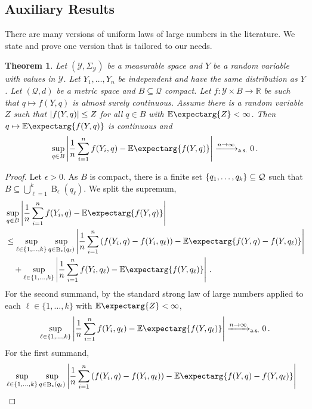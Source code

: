 \documentclass{scrartcl}
\renewcommand{\subset}{\subseteq}
\DeclareMathOperator{\ball}{\mathrm{B}}
\newcommand{\Ex}{\E\expectarg}
\newcommand*{\mc}[1]{\mathcal{#1}}
\newcommand*{\ms}[1]{\mathsf{#1}}
\newcommand{\R}{\mathbb{R}}
\newcommand{\equationFullstop}{\, .}
\newcommand{\eqfs}{\equationFullstop}
\theoremstyle{plain}\newtheorem{theorem}{Theorem}[section]
\theoremstyle{definition}
\theoremstyle{remark}
\begin{document}
\begin{appendix}
 \section{Auxiliary Results}\label{sec:aux}
There are many versions of uniform laws of large numbers in the literature. We state and prove one version that is tailored to our needs.
\begin{theorem}\label{thm:ULLN}
Let $(\mc Y, \Sigma_{\mc Y})$ be a measurable space and $Y$ be a random variable with values in $\mc Y$. Let $Y_1, \dots, Y_n$ be independent and have the same distribution as $Y$.
Let $(\mc Q, d)$ be a metric space and $B\subset \mc Q$ compact. 
Let $f \colon \mc Y \times B \to \R$ be such that $q \mapsto f(Y, q)$  is almost surely continuous. Assume there is a random variable $Z$ such that $\left| f(Y, q) \right| \leq Z$ for all $q \in B$ with $\Ex{Z} < \infty$. Then $q \mapsto \Ex{f(Y, q)}$ is continuous and 
\begin{equation*}
	\sup_{q\in B} \abs{\frac 1n \sum_{i=1}^n f(Y_i, q) - \Ex{f(Y, q)}} \xrightarrow{n\to\infty}_{\ms{a.s.}} 0 
	\eqfs
\end{equation*}
\end{theorem}
\begin{proof}
Let $\epsilon > 0$. As $B$ is compact, there is a finite set $\cb{q_1, \dots, q_k} \subset \mc Q$ such that $B \subset \bigcup_{\ell=1}^k\ball_\epsilon(q_\ell)$. We split the supremum,
\begin{align*}
	&\sup_{q\in B} \abs{\frac 1n \sum_{i=1}^n f(Y_i, q) - \Ex{f(Y, q)}}
	\\&\leq
	\sup_{\ell \in \cb{1,\dots, k}} 
	\sup_{q\in \ball_\epsilon(q_\ell)}  
		\abs{\frac 1n \sum_{i=1}^n \br{f(Y_i, q) - f(Y_i, q_\ell)} - \Ex{f(Y, q) - f(Y, q_\ell)}} 
	\\&\quad+ 
	\sup_{\ell \in \cb{1,\dots, k}} \abs{\frac 1n \sum_{i=1}^n f(Y_i, q_\ell) - \Ex{f(Y, q_\ell)}}
	\eqfs
\end{align*}
For the second summand, by the standard strong law of large numbers applied to each $\ell\in\{1,\dots,k\}$ with $\Ex{Z} < \infty$, 
\begin{align*}
\sup_{\ell \in \cb{1,\dots, k}} \abs{\frac 1n \sum_{i=1}^n f(Y_i, q_\ell) - \Ex{f(Y, q_\ell)}} \xrightarrow{n \to \infty}_{\ms{a.s.}} 0
\eqfs
\end{align*}
For the first summand,
\begin{align*}
	&\sup_{\ell \in \cb{1,\dots, k}} 
	\sup_{q\in \ball_\epsilon(q_\ell)}  
		\abs{\frac 1n \sum_{i=1}^n \br{f(Y_i, q) - f(Y_i, q_\ell)} - \Ex{f(Y, q) - f(Y, q_\ell)}} 

\end{align*}
\end{proof}
\end{appendix}
\end{document}
